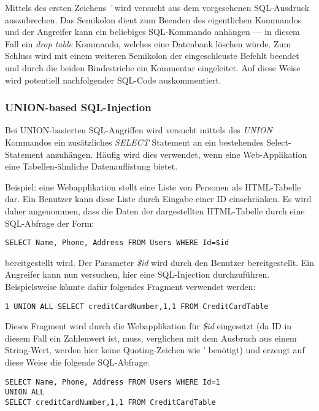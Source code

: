 Mittels des ersten Zeichens \textit{'} wird versucht aus dem vorgesehenen SQL-Ausdruck auszubrechen. Das Semikolon dient zum Beenden des eigentlichen Kommandos und der Angreifer kann ein beliebiges SQL-Kommando anhängen --- in diesem Fall ein \textit{drop table} Kommando, welches eine Datenbank löschen würde. Zum Schluss wird mit einem weiteren Semikolon der eingeschleuste Befehlt beendet und durch die beiden Bindestriche ein Kommentar eingeleitet. Auf diese Weise wird potentiell nachfolgender SQL-Code auskommentiert.

\subsubsection{UNION-based SQL-Injection}

Bei UNION-basierten SQL-Angriffen wird versucht mittels des \textit{UNION} Kommandos ein zusätzliches \textit{SELECT} Statement an ein bestehendes Select-Statement anzuhängen. Häufig wird dies verwendet, wenn eine Web-Applikation eine Tabellen-ähnliche Datenauflistung bietet.

Beispiel: eine Webapplikation stellt eine Liste von Personen als HTML-Tabelle dar. Ein Benutzer kann diese Liste durch Eingabe einer ID einschränken. Es wird daher angenommen, dass die Daten der dargestellten HTML-Tabelle durch eine SQL-Abfrage der Form:

\begin{verbatim}
SELECT Name, Phone, Address FROM Users WHERE Id=$id
\end{verbatim}

bereitgestellt wird. Der Parameter \textit{\$id} wird durch den Benutzer bereitgestellt. Ein Angreifer kann nun versuchen, hier eine SQL-Injection durchzuführen. Beispielsweise könnte dafür folgendes Fragment verwendet werden:

\begin{verbatim}
1 UNION ALL SELECT creditCardNumber,1,1 FROM CreditCardTable
\end{verbatim}

Dieses Fragment wird durch die Webapplikation für \textit{\$id} eingesetzt (da ID in diesem Fall ein Zahlenwert ist, muss, verglichen mit dem Ausbruch aus einem String-Wert, werden hier keine Quoting-Zeichen wie ' benötigt) und erzeugt auf diese Weise die folgende SQL-Abfrage:

\begin{verbatim}
SELECT Name, Phone, Address FROM Users WHERE Id=1
UNION ALL
SELECT creditCardNumber,1,1 FROM CreditCardTable
\end{verbatim}

